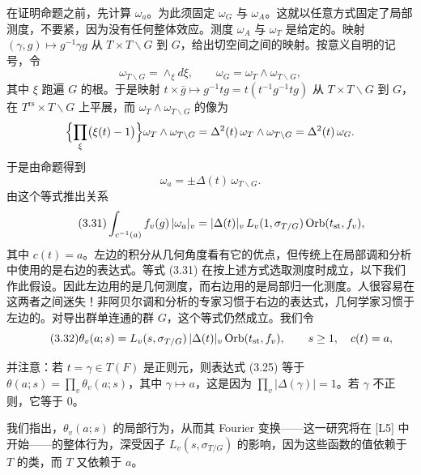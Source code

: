 在证明命题之前，先计算 $\omega_a$。为此须固定 $\omega_G$ 与 $\omega_A$。这就以任意方式固定了局部测度，不要紧，因为没有任何整体效应。测度 $\omega_A$ 与 $\omega_T$ 是给定的。映射 $(\gamma,g)\mapsto g^{-1}\gamma g$ 从 $T\times T\backslash G$ 到 $G$，给出切空间之间的映射。按意义自明的记号，令
\[
\omega_{T\backslash G}=\wedge_\xi d\xi,\qquad
\omega_G=\omega_T\wedge\omega_{T\backslash G},
\]
其中 $\xi$ 跑遍 $G$ 的根。于是映射 $t\times\bar g\mapsto g^{-1}tg=t(t^{-1}g^{-1}tg)$ 从 $T\times T\backslash G$ 到 $G$，在 $T^{\mathrm{rs}}\times T\backslash G$ 上平展，而 $\omega_T\wedge\omega_{T\backslash G}$ 的像为
\[
\Bigl\{\prod_\xi\bigl(\xi(t)-1\bigr)\Bigr\}\omega_T\wedge\omega_{T\backslash G}
=\Delta^2(t)\,\omega_T\wedge\omega_{T\backslash G}=\Delta^2(t)\,\omega_G.
\]
于是由命题得到
\begin{equation}\tag{3.30}
\omega_a=\pm\Delta(t)\,\omega_{T\backslash G}.
\end{equation}
由这个等式推出关系
\begin{equation}\tag{3.31}
\int_{c^{-1}(a)}f_v(g)\,|\omega_a|_v
=|\Delta(t)|_v\,L_v(1,\sigma_{T/G})\,\mathrm{Orb}(t_{\mathrm{st}},f_v),
\end{equation}
其中 $c(t)=a$。左边的积分从几何角度看有它的优点，但传统上在局部调和分析中使用的是右边的表达式。等式 (3.31) 在按上述方式选取测度时成立，以下我们作此假设。因此左边用的是几何测度，而右边用的是局部归一化测度。人很容易在这两者之间迷失！非阿贝尔调和分析的专家习惯于右边的表达式，几何学家习惯于左边的。对导出群单连通的群 $G$，这个等式仍然成立。我们令
\begin{equation}\tag{3.32}
\theta_v(a;s)=L_v(s,\sigma_{T/G})\,|\Delta(t)|_v\,\mathrm{Orb}(t_{\mathrm{st}},f_v),
\qquad s\ge1,\quad c(t)=a,
\end{equation}

并注意：若 $t=\gamma\in T(F)$ 是正则元，则表达式 (3.25) 等于 $\theta(a;s)=\prod_v\theta_v(a;s)$，其中 $\gamma\mapsto a$，这是因为 $\prod_v|\Delta(\gamma)|=1$。若 $\gamma$ 不正则，它等于 $0$。

我们指出，$\theta_v(a;s)$ 的局部行为，从而其 Fourier 变换——这一研究将在 [L5] 中开始——的整体行为，深受因子 $L_v(s,\sigma_{T/G})$ 的影响，因为这些函数的值依赖于 $T$ 的类，而 $T$ 又依赖于 $a$。

